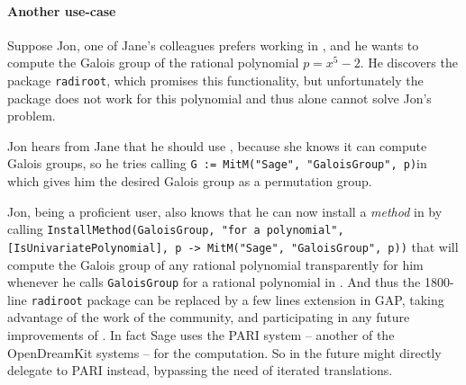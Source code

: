 \paragraph{Another use-case}

Suppose Jon, one of Jane's colleagues prefers working in \GAP, and he wants to
compute the Galois group of the rational polynomial $p = x^5 - 2$. He discovers
the \GAP package \texttt{radiroot}, which promises this functionality, but
unfortunately the package does not work for this polynomial and thus \GAP alone
cannot solve Jon's problem.

Jon hears from Jane that he should use \Sage, because she knows it can compute
Galois groups, so he tries calling \lstinline|G := MitM("Sage", "GaloisGroup",
p)|in \GAP which gives him the desired Galois group as a \GAP permutation group.

Jon, being a proficient \GAP user, also knows that he can now install a
\emph{method} in \GAP by calling \lstinline|InstallMethod(GaloisGroup, "for a
polynomial", [IsUnivariatePolynomial], p -> MitM("Sage", "GaloisGroup", p))|
that will compute the Galois group of any rational polynomial transparently
for him whenever he calls \lstinline|GaloisGroup| for a rational polynomial in
\GAP.
And thus the 1800-line
\lstinline|radiroot| package can be replaced by a few lines extension in GAP,
taking advantage of the work of the \Sage community, and participating in any
future improvements of \Sage. In fact Sage uses the PARI system -- another of
the OpenDreamKit systems -- for the computation.
So in the future \GAP might directly delegate to PARI instead, bypassing the need of iterated translations.  



